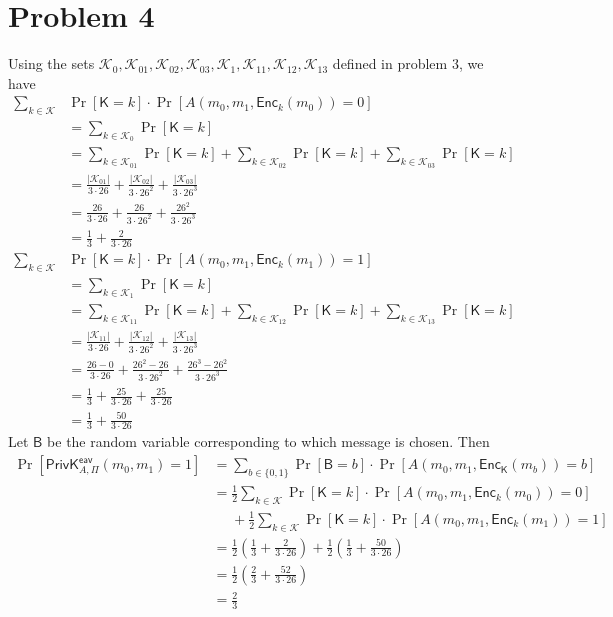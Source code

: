 \documentclass[12pt]{article}
\numberwithin{equation}{section}
\theoremstyle{plain}
\newcommand{\set}[1]{\{ #1 \}}
\DeclareMathOperator*{\prob}{Pr}
\newcommand{\keys}{\mathcal{K}}
\newcommand{\key}{\algo{K}}
\newcommand{\algo}[1]{\mathsf{#1}}
\newcommand{\priv}{\Pi}
\newcommand{\enc}{\algo{Enc}}
\newcommand{\expir}[3]{\algo{PrivK}^{#1}_{{#2},{#3}}}
\newcommand{\eav}{\algo{eav}}
\begin{document}
\section*{Problem 4}

\newcommand{\bit}{\algo{B}}

Using the sets $\keys_0, \keys_{01}, \keys_{02}, \keys_{03}, \keys_1, \keys_{11}, \keys_{12}, \keys_{13}$ defined in problem 3,
we have
\begin{align*}
    \sum_{k \in \keys}&{ \prob[\key = k] \cdot \prob[A(m_0, m_1, \enc_k(m_0)) = 0] }\\
        &= \sum_{k \in \keys_0} \prob[\key = k]\\
        &= \sum_{k \in \keys_{01}}{ \prob[\key = k] } + \sum_{k \in \keys_{02}}{ \prob[\key = k] } + \sum_{k \in \keys_{03}}{ \prob[\key = k] }\\
        &= \frac{|\keys_{01}|}{3 \cdot 26} + \frac{|\keys_{02}|}{3 \cdot 26^2} + \frac{|\keys_{03}|}{3 \cdot 26^3}\\
        &= \frac{26}{3 \cdot 26} + \frac{26}{3 \cdot 26^2} + \frac{26^2}{3 \cdot 26^3}\\
        &= \frac{1}{3} + \frac{2}{3 \cdot 26}\\
    \sum_{k \in \keys}&{ \prob[\key = k] \cdot \prob[A(m_0, m_1, \enc_k(m_1)) = 1] }\\
        &= \sum_{k \in \keys_1} \prob[\key = k]\\
        &= \sum_{k \in \keys_{11}}{ \prob[\key = k] } + \sum_{k \in \keys_{12}}{ \prob[\key = k] } + \sum_{k \in \keys_{13}}{ \prob[\key = k] }\\
        &= \frac{|\keys_{11}|}{3 \cdot 26} + \frac{|\keys_{12}|}{3 \cdot 26^2} + \frac{|\keys_{13}|}{3 \cdot 26^3}\\
        &= \frac{26 - 0}{3 \cdot 26} + \frac{26^2 - 26}{3 \cdot 26^2} + \frac{26^3 - 26^2}{3 \cdot 26^3}\\
        &= \frac{1}{3} + \frac{25}{3 \cdot 26} + \frac{25}{3 \cdot 26}\\
        &= \frac{1}{3} + \frac{50}{3 \cdot 26}
\end{align*}
Let $\bit$ be the random variable corresponding to which message is chosen.
Then
\begin{align*}
    \prob[\expir{\eav}{A}{\priv}(m_0, m_1) = 1]
        &= \sum_{b \in \set{ 0, 1 }}{ \prob[\bit = b] \cdot \prob[A(m_0, m_1, \enc_{\key}(m_b)) = b] }\\
        &= \frac{1}{2} \sum_{k \in \keys}{ \prob[\key = k] \cdot \prob[A(m_0, m_1, \enc_{k}(m_0)) = 0] }\\
        &\mathrel{\phantom{=}} \mathrel{+} \frac{1}{2} \sum_{k \in \keys}{ \prob[\key = k] \cdot \prob[A(m_0, m_1, \enc_{k}(m_1)) = 1] }\\
        &= \frac{1}{2} ( \frac{1}{3} + \frac{2}{3 \cdot 26} ) + \frac{1}{2} ( \frac{1}{3} + \frac{50}{3 \cdot 26} )\\
        &= \frac{1}{2} (\frac{2}{3} + \frac{52}{3 \cdot 26} )\\
        &= \frac{2}{3}
\end{align*}

\let\bit\undefined
\end{document}
